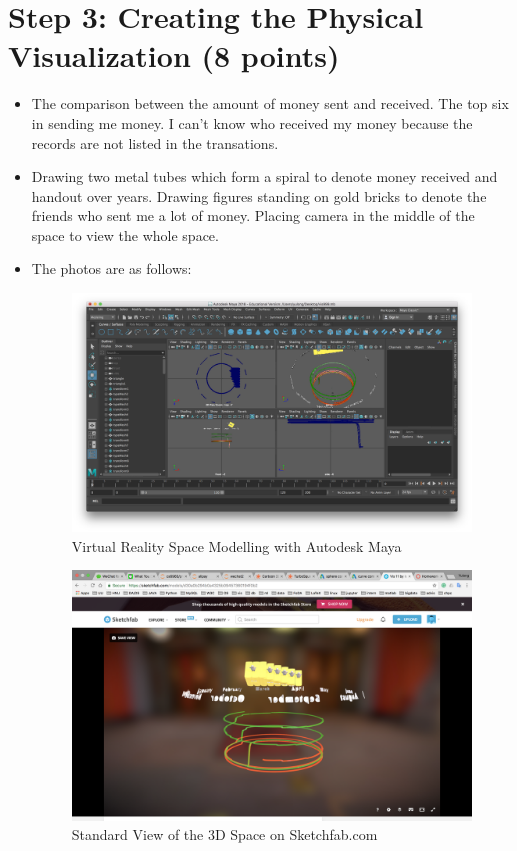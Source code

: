 \documentclass[12pt]{article}
\begin{document}
\section*{Step 3: Creating the Physical Visualization (8 points)}
\begin{itemize}
\item The comparison between the amount of money sent and received. The top six in sending me money. I can't know who received my money because the records are not listed in the transations.
\item Drawing two metal tubes which form a spiral to denote money received and handout over years. Drawing figures standing on gold bricks to denote the friends who sent me a lot of money. Placing camera in the middle of the space to view the whole space.
\item The photos are as follows:
\begin{figure}[h]
\centering
\includegraphics[width=.8\linewidth]{1.png}
\caption{Virtual Reality Space Modelling with Autodesk Maya}
\label{fig:name}
\end{figure}
\begin{figure}[h]
\centering
\includegraphics[width=.8\linewidth]{2.png}
\caption{Standard View of the 3D Space on Sketchfab.com}
\label{fig:name}
\end{figure}

\end{itemize}
\end{document}
